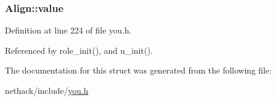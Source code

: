 \hypertarget{structAlign_a0fd9044db67c458ef85ff28c84593947}{
\subsubsection[{value}]{ Align\+::value}}\label{structAlign_a0fd9044db67c458ef85ff28c84593947}


Definition at line 224 of file you.\+h.



Referenced by role\+\_\+init(), and u\+\_\+init().



The documentation for this struct was generated from the following file\+:\begin{DoxyCompactItemize}
\item 
nethack/include/\hyperlink{you_8h}{you.\+h}\end{DoxyCompactItemize}
